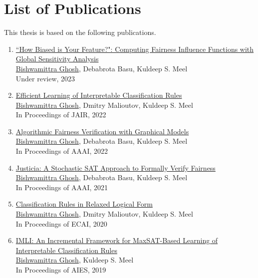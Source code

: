 
\clearpage
\section*{List of Publications}
This thesis is based on the following publications.

\begin{enumerate}
	
	\item \href{https://arxiv.org/pdf/2206.00667.pdf}{``How Biased is Your Feature?": Computing Fairness Influence Functions with Global Sensitivity Analysis}\\
	\underline{Bishwamittra Ghosh}, Debabrota Basu, Kuldeep S. Meel\\
	Under review, 2023
	
	\item \href{https://arxiv.org/pdf/2205.06936.pdf}{Efficient Learning of Interpretable Classification Rules} \\
	\underline{Bishwamittra Ghosh}, Dmitry Malioutov, Kuldeep S. Meel\\
	In Proceedings of JAIR, 2022
	
	\item \href{https://arxiv.org/pdf/2109.09447.pdf}{Algorithmic Fairness Verification with Graphical Models} \\
	\underline{Bishwamittra Ghosh}, Debabrota Basu, Kuldeep S. Meel\\
	In Proceedings of AAAI, 2022
		
	\item \href{https://arxiv.org/pdf/2009.06516.pdf}{Justicia: A Stochastic SAT Approach to Formally Verify Fairness} \\
	\underline{Bishwamittra Ghosh}, Debabrota Basu, Kuldeep S. Meel\\
	In Proceedings of AAAI, 2021
	
	
	\item \href{https://bishwamittra.github.io/publication/ecai_2020/paper.pdf}{Classification Rules in Relaxed Logical Form
	} \\
	\underline{Bishwamittra Ghosh}, Dmitry Malioutov, Kuldeep S. Meel\\
	In Proceedings of ECAI, 2020
	
	\item \href{https://bishwamittra.github.io/publication/imli-ghosh.pdf}{IMLI: An Incremental Framework for MaxSAT-Based Learning of Interpretable Classification Rules}\\
	\underline{Bishwamittra Ghosh}, Kuldeep S. Meel\\
	In Proceedings of AIES, 2019
	
	
\end{enumerate}
\clearpage
